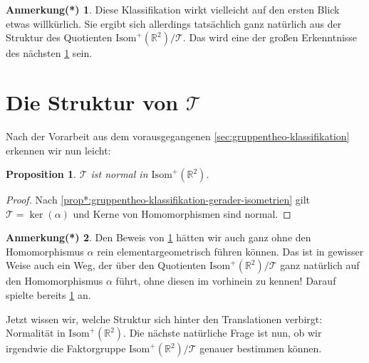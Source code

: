 \documentclass[a4paper, ngerman]{article}
\newcounter{chapter}
\numberwithin{equation}{chapter}
\theoremstyle{plain}
\newtheorem{proposition}{Proposition}[chapter]
\theoremstyle{definition}
\newtheorem{annotationstrd}{Anmerkung(*)}[chapter]
\newcommand{\geradisometr}{\ensuremath{\mathrm{Isom}^+(\mathbb R^2)}}
\begin{document}
\begin{annotationstrd}\label{ann*:alpha-ergibt-sich-aus-struktur}
    Diese Klassifikation wirkt vielleicht auf den ersten Blick etwas will\-kür\-lich. Sie ergibt sich allerdings tatsächlich ganz natürlich aus der Struktur des Quotienten \(\mathrm{Isom}^+(\mathbb R^2) /\mathcal T\). Das wird eine der großen Erkenntnisse des nächsten \cref{sec:struktur-von-translationen} sein. 
\end{annotationstrd}

\section{Die Struktur von \(\mathcal T\)}\label{sec:struktur-von-translationen}

Nach der Vorarbeit aus dem vorausgegangenen \cref{sec:gruppentheo-klassifikation} erkennen wir nun leicht: 
\begin{proposition}\label{prop:normale-translationen}
    \(\mathcal T\) ist normal in \(\geradisometr\). 
\end{proposition}
\begin{proof}
    Nach \cref{prop*:gruppentheo-klassifikation-gerader-isometrien} gilt \(\mathcal T = \ker(\alpha)\) und Kerne von Homomorphismen sind normal. 
\end{proof}
\begin{annotationstrd}
    Den Beweis von \cref{prop:normale-translationen} hätten wir auch ganz ohne den Homomorphismus \(\alpha\) rein elementargeometrisch führen können. Das ist in gewisser Weise auch ein Weg, der über den Quotienten \(\geradisometr/\mathcal T\) ganz natürlich auf den Homomorphismus \(\alpha\) führt, ohne diesen im vorhinein zu kennen! Darauf spielte bereits \cref{ann*:alpha-ergibt-sich-aus-struktur} an.
\end{annotationstrd}
\noindent Jetzt wissen wir, welche Struktur sich hinter den Translationen verbirgt: Normalität in \(\geradisometr\). Die nächste natürliche Frage ist nun, ob wir irgendwie die Faktorgruppe \(\geradisometr /\mathcal T\) genauer bestimmen können. 
\end{document}
